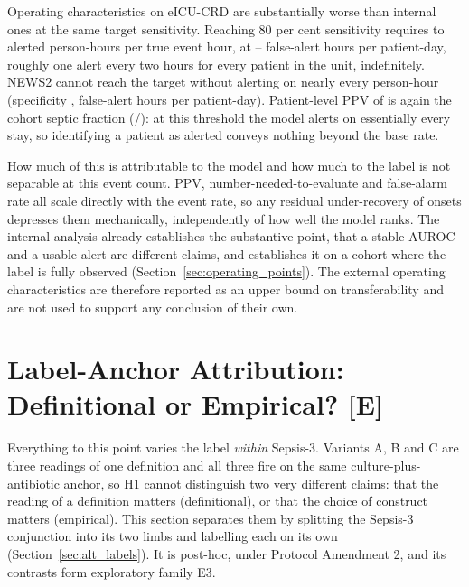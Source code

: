 Operating characteristics on eICU-CRD are substantially worse than internal ones
at the same target sensitivity. Reaching 80 per cent sensitivity requires
\pcExtNnePrimaryC{} to \pcExtNnePrimaryA{} alerted person-hours per true event
hour, at \pcExtFaPerPtDayPrimaryB--\pcExtFaPerPtDayPrimaryA{} false-alert hours
per patient-day, roughly one alert every two hours for every patient in the
unit, indefinitely. NEWS2 cannot reach the target without alerting on nearly
every person-hour (specificity \pcExtSpecNewsB, \pcExtFaPerPtDayNewsB{}
false-alert hours per patient-day). Patient-level PPV of
\pcExtPatientPpvPrimaryB{} is again the cohort septic fraction
(\pcExtNSepsisStays/\pcExtNStays): at this threshold the model alerts on
essentially every stay, so identifying a patient as alerted conveys nothing
beyond the base rate.

How much of this is attributable to the model and how much to the label is not
separable at this event count. PPV, number-needed-to-evaluate and false-alarm
rate all scale directly with the event rate, so any residual under-recovery of
onsets depresses them mechanically, independently of how well the model ranks.
The internal analysis already establishes the substantive point, that a
stable AUROC and a usable alert are different claims, and establishes it on a
cohort where the label is fully observed
(Section~\ref{sec:operating_points}). The external operating characteristics
are therefore reported as an upper bound on transferability and are not used to
support any conclusion of their own.



\section{Label-Anchor Attribution: Definitional or Empirical?
\texorpdfstring{[E]}{[E]}}
\label{sec:label_anchor_results}

Everything to this point varies the label \emph{within} Sepsis-3. Variants A, B
and C are three readings of one definition and all three fire on the same
culture-plus-antibiotic anchor, so H1 cannot distinguish two very different
claims: that the reading of a definition matters (definitional), or that the
choice of construct matters (empirical). This section separates them by
splitting the Sepsis-3 conjunction into its two limbs and labelling each on its
own (Section~\ref{sec:alt_labels}). It is post-hoc, under Protocol
Amendment 2, and its contrasts form exploratory family E3.

